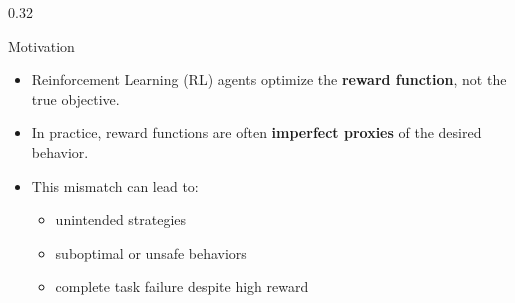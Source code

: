\begin{frame}[t]

	\begin{columns}[t]

		\begin{column}{0.32\textwidth}



			\begin{block}{Motivation}

				\begin{itemize}
					\item Reinforcement Learning (RL) agents optimize the \textbf{reward function}, not the true objective.

					      \medskip

					\item In practice, reward functions are often \textbf{imperfect proxies} of the desired behavior.

					      \medskip

					\item This mismatch can lead to:

					      \medskip

					      \begin{itemize}
						      \item unintended strategies

						            \medskip

						      \item suboptimal or unsafe behaviors

						            \medskip

						      \item complete task failure despite high reward
					      \end{itemize}
				\end{itemize}


\end{block}
\end{column}
\end{columns}
\end{frame}
